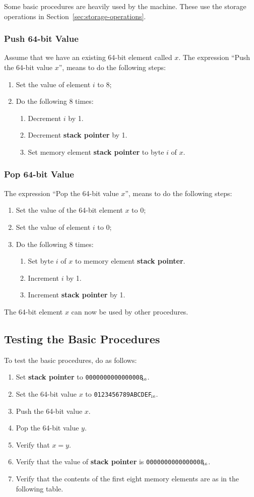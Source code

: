 \documentclass[a4paper,11pt]{article}
\newcommand{\SP}{\textbf{stack pointer}\xspace}
\newcommand{\num}[1]{\texttt{#1}\xspace}
\newcommand{\hex}[1]{\num{#1}$_{\textup{\tiny\hskip-1ex 16}}$\xspace}
\begin{document}
Some basic procedures are heavily used by the machine.
These use the storage operations in Section~\ref{sec:storage-operations}.

\subsubsection{Push 64-bit Value}

Assume that we have an existing 64-bit element called $x$.
The expression ``Push the 64-bit value $x$'', means to do the following steps:
\begin{enumerate}
\item Set the value of element $i$ to 8;
\item Do the following 8 times:
  \begin{enumerate}
  \item Decrement $i$ by 1.
  \item Decrement \SP by 1.
  \item Set memory element \SP to byte $i$ of $x$.
  \end{enumerate}
\end{enumerate}

\subsubsection{Pop 64-bit Value}

The expression ``Pop the 64-bit value $x$'', means to do the following steps:
\begin{enumerate}
\item Set the value of the 64-bit element $x$ to 0;
\item Set the value of element $i$ to 0;
\item Do the following 8 times:
  \begin{enumerate}
  \item Set byte $i$ of $x$ to memory element \SP.
  \item Increment $i$ by 1.
  \item Increment \SP by 1.
  \end{enumerate}
\end{enumerate}
The 64-bit element $x$ can now be used by other procedures.

\subsection{Testing the Basic Procedures}

To test the basic procedures, do as follows:
\begin{enumerate}
\item Set \SP to \hex{0000000000000008}.
\item Set the 64-bit value $x$ to \hex{0123456789ABCDEF}.
\item Push the 64-bit value $x$.
\item Pop the 64-bit value $y$.
\item Verify that $x=y$.
\item Verify that the value of \SP is \hex{0000000000000008}.
\item Verify that the contents of the first eight memory elements are as in the following table.
\end{enumerate}
\end{document}
